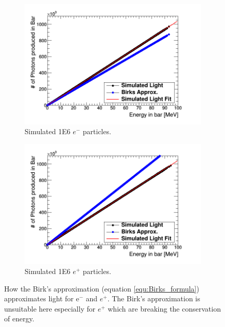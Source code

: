 \begin{figure}[htbp]
\centering
\begin{subfigure}{.5\textwidth}
  \centering
  \includegraphics[width=\linewidth]{Appendix5/Figs/light_of_electrons0-100mev.png}
  \captionsetup{width=.9\linewidth}
  \caption{Simulated 1E6 $e^-$ particles.}
  \label{subfig:append5_light_of_electrons0-100mev}
\end{subfigure}%
\begin{subfigure}{.5\textwidth}
  \centering
  \includegraphics[width=\linewidth]{Appendix5/Figs/light_of_positrons0-100mev.png}
  \captionsetup{width=.9\linewidth}
  \caption{Simulated 1E6 $e^+$ particles.}
  \label{subfig:append5_light_of_positrons0-100mev}
\end{subfigure}
\caption{How the Birk's approximation (equation \ref{equ:Birks_formula}) approximates light for e$^-$ and $e^+$. The Birk's approximation is unsuitable here especially for $e^+$ which are breaking the conservation of energy.}
\label{fig:append5_light_of_electrons_positrons0-100mev}
\end{figure}

